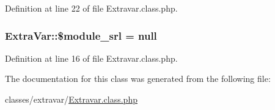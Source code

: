 Definition at line 22 of file Extravar.\-class.\-php.

\hypertarget{classExtraVar_a3a84e48f2cdf01660b2844244f8fd9f7}{
\subsubsection[{\$module\-\_\-srl}]{\setlength{\rightskip}{0pt plus 5cm}Extra\-Var\-::\$module\-\_\-srl = null}}\label{classExtraVar_a3a84e48f2cdf01660b2844244f8fd9f7}


Definition at line 16 of file Extravar.\-class.\-php.



The documentation for this class was generated from the following file\-:\begin{DoxyCompactItemize}
\item 
classes/extravar/\hyperlink{Extravar_8class_8php}{Extravar.\-class.\-php}\end{DoxyCompactItemize}
